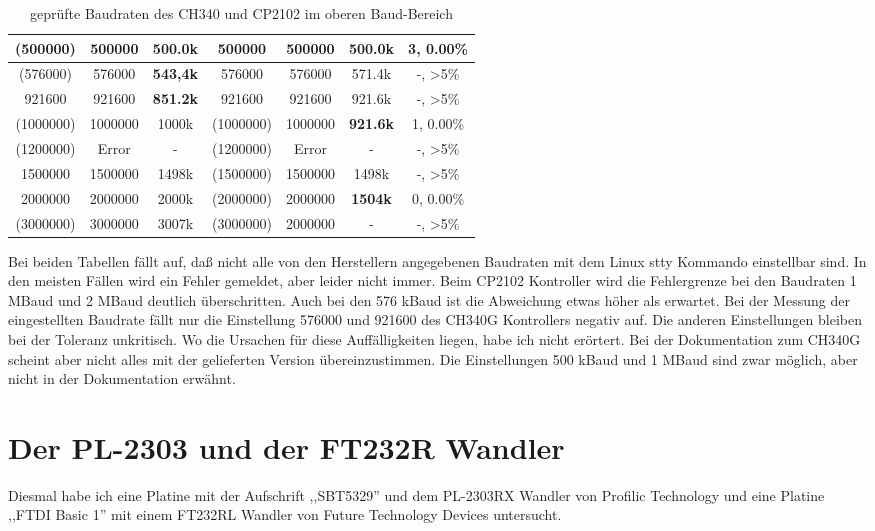 \begin{table}[H]
\begin{center}
\begin{tabular}{| c | c | c || c | c | c || c |}
    \hline
    (500000) &  500000  &  500.0k   &  500000   & 500000 & 500.0k    &   3, 0.00\%  \\
    \hline
    (576000) &  576000  & \bf{543,4k} &  576000   & 576000 & 571.4k   &   -, >5\%  \\
    \hline
     921600  &  921600  & \bf{851.2k} & 921600 & 921600 & 921.6k    &   -, >5\%  \\
    \hline
    (1000000) & 1000000  &  1000k    & (1000000) & 1000000 & \bf{921.6k}  &   1, 0.00\%  \\
    \hline
    (1200000) &  Error   &   -       & (1200000) & Error   &   -       &  -, >5\%  \\
    \hline
    1500000  & 1500000  &  1498k    & (1500000) & 1500000 & 1498k   &  -, >5\%  \\
    \hline
    2000000  & 2000000  &  2000k    & (2000000) & 2000000 & \bf{1504k}    & 0, 0.00\%  \\
    \hline
   (3000000) & 3000000  &  3007k    & (3000000) & 2000000 &   -       &  -, >5\%   \\
    \hline
    \end{tabular}
  \end{center}
  \caption{geprüfte Baudraten des CH340 und CP2102 im oberen Baud-Bereich}
  \label{tab:CH340baudh}
\end{table}

Bei beiden Tabellen fällt auf, daß nicht alle von den Herstellern angegebenen Baudraten
mit dem Linux stty Kommando einstellbar sind. In den meisten Fällen wird ein Fehler gemeldet,
aber leider nicht immer. Beim CP2102 Kontroller wird die Fehlergrenze bei den
Baudraten 1 MBaud und 2 MBaud deutlich überschritten. Auch bei den 576 kBaud ist die
Abweichung etwas höher als erwartet. 
Bei der Messung der eingestellten Baudrate fällt nur die Einstellung 576000 und 921600 des CH340G
Kontrollers negativ auf. Die anderen Einstellungen bleiben bei der Toleranz unkritisch.
Wo die Ursachen für diese Auffälligkeiten liegen, habe ich nicht erörtert.
Bei der Dokumentation zum CH340G scheint aber nicht alles mit der gelieferten Version
übereinzustimmen. Die Einstellungen 500 kBaud und 1 MBaud sind zwar möglich, aber nicht in der
Dokumentation erwähnt.


\section{Der PL-2303 und der FT232R Wandler}
Diesmal habe ich eine Platine mit der Aufschrift ,,SBT5329'' und dem PL-2303RX Wandler von Profilic Technology
und eine Platine ,,FTDI Basic 1'' mit einem FT232RL Wandler von Future Technology Devices untersucht.

